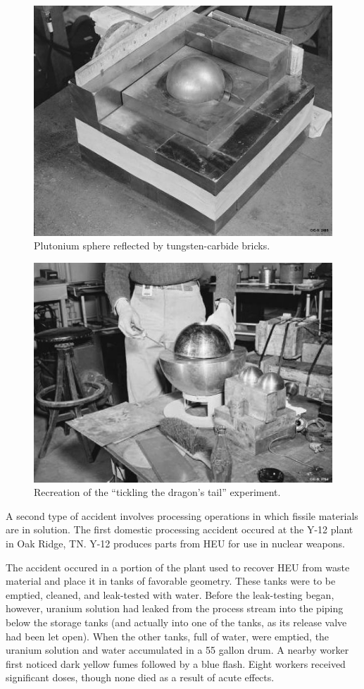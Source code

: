 \begin{figure}[ht] 
    \centering
    \includegraphics[keepaspectratio, width = 4.0 in]{images/pu_sphere}
    \caption{Plutonium sphere reflected by tungsten-carbide bricks.}
    \label{fig:pu_sphere}
\end{figure}

\begin{figure}[ht] 
    \centering
    \includegraphics[keepaspectratio, width = 4.0 in]{images/pu_sphere_2}
    \caption{Recreation of the ``tickling the dragon's tail'' 
             experiment.}
    \label{fig:pu_sphere_2}
\end{figure}


A second type of accident involves processing operations in which
fissile materials are in solution.  The first domestic processing
accident occured at the Y-12 plant in Oak Ridge, TN.  Y-12 
produces parts from HEU for use in nuclear weapons.  

The accident occured in a portion of the plant used to 
recover HEU from waste material and place it in tanks of favorable
geometry.  These tanks were to be emptied, cleaned, and leak-tested 
with water.  Before the leak-testing began, however, uranium 
solution had leaked from the process stream into the piping
below the storage tanks (and actually into one of the tanks,
as its release valve had been let open).  When the other tanks, full
of water, were emptied, the uranium solution and water accumulated
in a 55 gallon drum.  A nearby worker first noticed dark yellow
fumes followed by a blue flash.  Eight workers received significant
doses, though none died as a result of acute effects.

